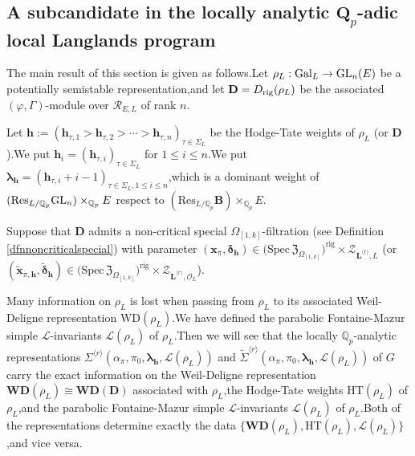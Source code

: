 \documentclass[SecEq,CM,GP]{degruyter-crelle} %
\theoremstyle{plain}
\newcommand{\bmdel}{{ \bm{\delta}_\bh}}
\newcommand{\Dpik}{{\mathbf{D}}}
\newcommand{\gal}{{\rm Gal}}
\newcommand{\GLN}{{\rm GL}}
\newcommand{\hpi}{{{\mathbf{h}}}}
\newcommand{\lrr}{{\langle r\rangle}}
\newcommand{\omepik}{\Omega_{[1,k]}}
\newcommand{\rig}{{\rm rig}}
\newcommand{\rigch}{{\mathcal{Z}_{\bL^{\lrr},\mathcal{O}_L}}}
\newcommand{\rigchl}{{\mathcal{Z}_{\bL^{\lrr},L}}}
\newcommand{\sbanpik}{{\big(\mathrm{Spec}\hspace{2pt}\mathfrak{Z}_{\omepik}\big)^{\mathrm{rig}}}}
\newcommand{\wdre}{{\textbf{WD}}}
\newcommand{\BQ}{{\mathbb{Q}}}
\newcommand{\bB}{{\mathbf{B}}}
\newcommand{\bL}{{\mathbf{L}}}
\newcommand{\bQ}{{\mathbf{Q}}}
\newcommand{\bx}{{\mathbf{x}}}
\newcommand{\bh}{{\mathbf{h}}}
\newcommand{\cR}{\mathcal R}
\newcommand{\sL}{\mathcal L}
\begin{document}
\subsection{A subcandidate in the locally analytic \texorpdfstring{$\bQ_p$}{Lg}-adic local Langlands program}
The main result of this section is given as follows.\;Let $\rho_L:\gal_L\rightarrow \GLN_{n}(E)$ be a potentially semistable representation,\;and let $\Dpik=D_{\rig}(\rho_L)$ be the associated  
$(\varphi,\Gamma)$-module over $\cR_{E,L}$ of rank $n$.\;

Let  $\bh:=(\hpi_{\tau,1}>\hpi_{\tau,2}>\cdots>\hpi_{\tau,n} )_{\tau\in \Sigma_L}$ be the Hodge-Tate weights of $\rho_L$ (or $\Dpik$).\;We put $\hpi_{i}=(\hpi_{\tau,i})_{\tau\in \Sigma_L}$ for $1\leq i\leq n$.\;We put ${\bm\lambda}_\bh=(\hpi_{\tau,i}+i-1)_{\tau\in \Sigma_L,1\leq i\leq n}$,\;which is a dominant weight of $(\mathrm{Res}_{L/\BQ_p}\GLN_n)\times_{\BQ_p}E$ respect to $(\mathrm{Res}_{L/\BQ_p}\bB)\times_{\BQ_p}E$.\;

Suppose that $\Dpik$ admits a non-critical special  $\omepik$-filtration (see Definition \ref{dfnnoncriticalspecial}) with
parameter $(\bx_{\pi},\bmdel)\in \sbanpik\times\rigchl $ (or $(\widetilde{\bx}_{\pi,\bh},\widetilde{\bm{\delta}}_\bh)\in \sbanpik\times\rigch $).\;

Many information on $\rho_L$ is lost when passing from $\rho_L$ to its associated Weil-Deligne representation $\mathrm{WD}(\rho_L)$.\;We have defined the parabolic Fontaine-Mazur simple $\sL$-invariants $\sL(\rho_L)$ of  $\rho_L$.\;Then we will see that the locally $\BQ_p$-analytic representations $\Sigma^{\lrr}(\alpha_\pi ,\pi_0, {\bm\lambda}_\bh, \sL(\rho_L))$ and $\widetilde{\Sigma}^{\lrr}(\alpha_\pi ,\pi_0,{\bm\lambda}_\bh, \sL(\rho_L))$ of $G$ carry the exact information on the Weil-Deligne representation $\wdre(\rho_L)\cong\wdre(\Dpik)$ associated with $\rho_L$,\;the Hodge-Tate weights $\mathrm{HT}(\rho_L)$ of $\rho_L$,\;and the parabolic Fontaine-Mazur simple $\sL$-invariants $\sL(\rho_L)$ of $\rho_L$.\;Both of the representations  determine exactly the data $\{\wdre(\rho_L), \mathrm{HT}(\rho_L), \sL(\rho_L)\}$,\;and vice versa.
\end{document}
